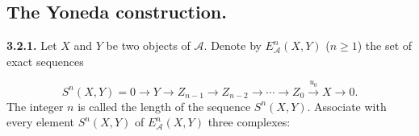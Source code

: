 \subsection{The Yoneda construction.}

\noindent\textbf{3.2.1.}\quad
Let $X$ and $Y$ be two objects of $\mathcal A$. Denote by
$E_{\mathcal A}^{n}(X,Y)$ ($n\geq1$) the set of exact sequences

\[
S^n(X,Y)=0\longrightarrow Y\longrightarrow Z_{n-1}
\longrightarrow Z_{n-2}\longrightarrow\cdots\longrightarrow Z_0
\xrightarrow{u_0}X\longrightarrow0.
\]
The integer $n$ is called the length of the sequence $S^n(X,Y)$. Associate
with every element $S^n(X,Y)$ of $E_{\mathcal A}^{n}(X,Y)$ three complexes:
\endgroup
